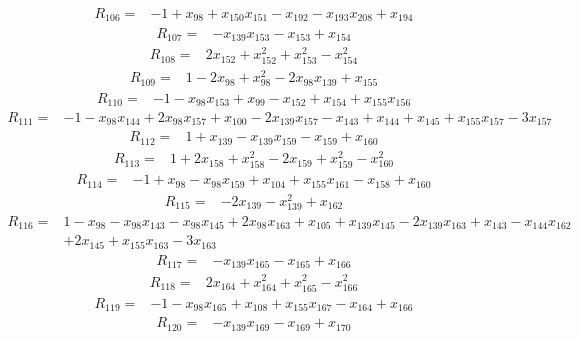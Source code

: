 \begin{align*}
 R_{106}={}&-1 +x_{98} +x_{150}x_{151} -x_{192} -x_{193}x_{208} +x_{194}
\end{align*}
\begin{align*}
 R_{107}={}&-x_{139}x_{153} -x_{153} +x_{154}
\end{align*}
\begin{align*}
 R_{108}={}&2x_{152} +x_{152}^{2} +x_{153}^{2} -x_{154}^{2}
\end{align*}
\begin{align*}
 R_{109}={}&1 -2x_{98} +x_{98}^{2} -2x_{98}x_{139} +x_{155}
\end{align*}
\begin{align*}
 R_{110}={}&-1 -x_{98}x_{153} +x_{99} -x_{152} +x_{154} +x_{155}x_{156}
\end{align*}
\begin{align*}
 R_{111}={}&-1 -x_{98}x_{144} +2x_{98}x_{157} +x_{100} -2x_{139}x_{157} -x_{143} +x_{144} +x_{145} +x_{155}x_{157} -3x_{157}
\end{align*}
\begin{align*}
 R_{112}={}&1 +x_{139} -x_{139}x_{159} -x_{159} +x_{160}
\end{align*}
\begin{align*}
 R_{113}={}&1 +2x_{158} +x_{158}^{2} -2x_{159} +x_{159}^{2} -x_{160}^{2}
\end{align*}
\begin{align*}
 R_{114}={}&-1 +x_{98} -x_{98}x_{159} +x_{104} +x_{155}x_{161} -x_{158} +x_{160}
\end{align*}
\begin{align*}
 R_{115}={}&-2x_{139} -x_{139}^{2} +x_{162}
\end{align*}
\begin{align*}
 R_{116}={}&1 -x_{98} -x_{98}x_{143} -x_{98}x_{145} +2x_{98}x_{163} +x_{105} +x_{139}x_{145} -2x_{139}x_{163} +x_{143} -x_{144}x_{162}\\
 &+2x_{145} +x_{155}x_{163} -3x_{163}
\end{align*}
\begin{align*}
 R_{117}={}&-x_{139}x_{165} -x_{165} +x_{166}
\end{align*}
\begin{align*}
 R_{118}={}&2x_{164} +x_{164}^{2} +x_{165}^{2} -x_{166}^{2}
\end{align*}
\begin{align*}
 R_{119}={}&-1 -x_{98}x_{165} +x_{108} +x_{155}x_{167} -x_{164} +x_{166}
\end{align*}
\begin{align*}
 R_{120}={}&-x_{139}x_{169} -x_{169} +x_{170}
\end{align*}
